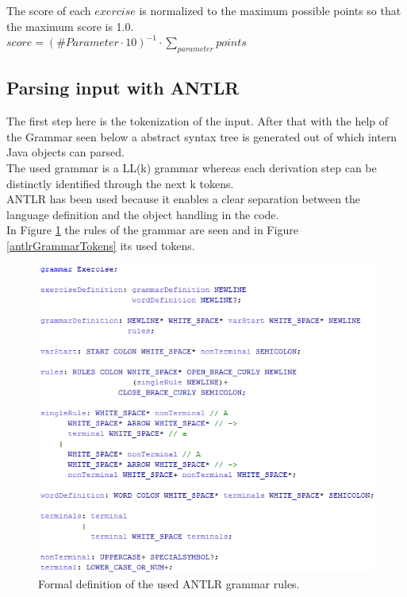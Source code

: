 \noindent The score of each $exercise$ is normalized to the maximum possible points so that the maximum score is 1.0.\\
$score = (\#Parameter\cdot10)^{-1}\cdot\sum\limits_{parameter}^{}points$
\pagebreak

\subsection{Parsing input with ANTLR}
The first step here is the tokenization of the input. After that with the help of the Grammar seen below a abstract syntax tree is generated out of which intern Java objects can parsed.\\
The used grammar is a LL(k) grammar whereas each derivation step can be distinctly identified through the next k tokens.\\
ANTLR has been used because it enables a clear separation between the language definition and the object handling in the code.\\
In Figure \ref{antlrGrammarRules} the rules of the grammar are seen and in Figure \ref{antlrGrammarTokens} its used tokens.
\noindent
\begin{figure} [h]
		\centering
		\includegraphics{abb/antrlRules.png}
	\caption{Formal definition of the used ANTLR grammar rules.}
	\label{antlrGrammarRules}
\end{figure}
